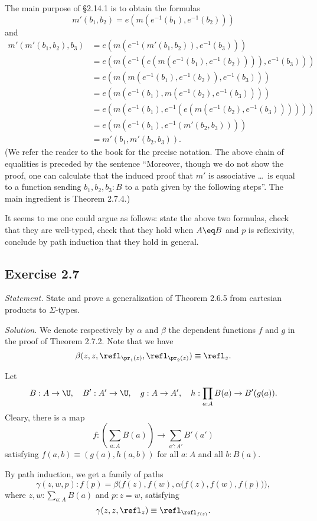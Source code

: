 \documentclass[12pt]{article}
\begin{document}
The main purpose of \S2.14.1 is to obtain the formulas
$$
m'(b_1,b_2)=e(m(e^{-1}(b_1),e^{-1}(b_2)))
$$ 
and
\begin{equation*}
  \begin{aligned}
    m'(m'(b_1,b_2),b_3)
    &= e(m(e^{-1}(m'(b_1,b_2)),e^{-1}(b_3))) \\
    &= e(m(e^{-1}(e(m(e^{-1}(b_1),e^{-1}(b_2)))),e^{-1}(b_3))) \\
    &= e(m(m(e^{-1}(b_1),e^{-1}(b_2)),e^{-1}(b_3))) \\
    &= e(m(e^{-1}(b_1),m(e^{-1}(b_2),e^{-1}(b_3)))) \\
    &= e(m(e^{-1}(b_1),e^{-1}(e(m(e^{-1}(b_2),e^{-1}(b_3)))))) \\
    &= e(m(e^{-1}(b_1),e^{-1}(m'(b_2,b_3)))) \\
    &= m'(b_1,m'(b_2,b_3)).
\end{aligned}
\end{equation*}
(We refer the reader to the book for the precise notation. The above chain of equalities is preceded by the sentence ``Moreover, though we do not show the proof, one can calculate that the induced proof that $m'$ is associative \dots\ is equal to a function sending $b_1,b_2,b_3:B$ to a path given by the following steps''. The main ingredient is Theorem 2.7.4.)

It seems to me one could argue as follows: state the above two formulas, check that they are well-typed, check that they hold when $A\eq B$ and $p$ is reflexivity, conclude by path induction that they hold in general.


\subsection{Exercise 2.7}

\emph{Statement.} State and prove a generalization of Theorem 2.6.5 from cartesian products to $\Sigma$-types. 

\nn\emph{Solution.} We denote respectively by $\alpha$ and $\beta$ the dependent functions $f$ and $g$ in the proof of Theorem 2.7.2. Note that we have 
$$
\beta(z,z,\refl_{\pr_1(z)},\refl_{\pr_2(z)})\equiv\refl_z.
$$

Let 
$$
B:A\to\U,\quad B':A'\to\U,\quad g:A\to A',\quad h:\prod_{a:A}B(a)\to B'(g(a)).
$$ 
Cleary, there is a map 
$$
f:\left(\sum_{a:A}B(a)\right)\to\sum_{a':A'}B'(a')
$$ 
satisfying $f(a,b)\equiv (g(a),h(a,b))$ for all $a:A$ and all $b:B(a)$. 

By path induction, we get a family of paths 
$$
\gamma(z,w,p):f(p)=\beta\Big(f(z),f(w),\alpha\big(f(z),f(w),f(p)\big)\Big),
$$ 
where $z,w:\sum_{a:A}B(a)$ and $p:z=w$, satisfying 
$$
\gamma(z,z,\refl_z)\equiv\refl_{\refl_{f(z)}}.
$$
\end{document}
